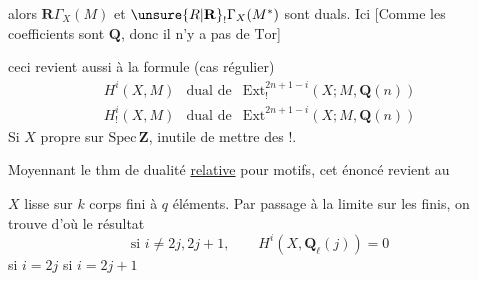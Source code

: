 alors $\mathbf{R}\Gamma_X(M)$ et $\unsure{R|\mathbf{R}}_!\Gamma_X(M^*)$  sont duals. Ici [Comme les coefficients sont  $\mathbf{Q}$\unsure{\}}, donc il n'y a pas de $\mathrm{Tor}$]

ceci revient aussi à la formule (cas régulier)
\[
\boxed{\begin{array}{lll}
H^i(X,M)&\text{dual de}&\mathrm{Ext}_!^{2n+1-i}(X;M,\mathbf{Q}(n))\\
H^i_!(X,M)&\text{dual de}&\mathrm{Ext}^{2n+1-i}(X;M,\mathbf{Q}(n))
\end{array}}
\]
Si $X$ propre sur $\mathrm{Spec}\,\mathbf{Z}$, inutile de mettre des $!$.

Moyennant le thm de dualité \uline{relative} pour motifs, cet énoncé revient au

$X$  lisse  sur $k$ corps fini à $q$ éléments.
Par passage à la limite sur les   finis, on trouve
d'où le résultat
\[
\text{si }i\ne2j,2j+1,\qquad H^i(X,\mathbf{Q}_\ell(j))=0
\]
si $i=2j$
si $i=2j+1$

